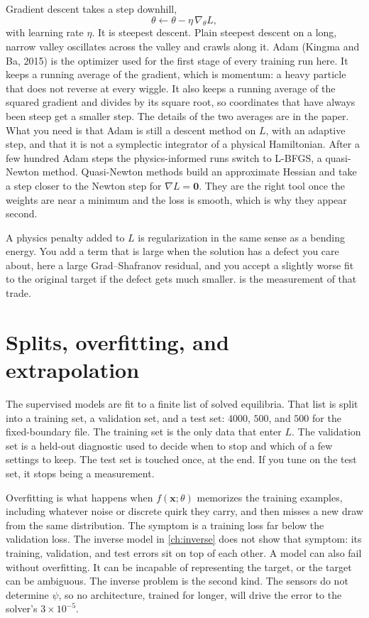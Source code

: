 \documentclass[11pt,a4paper,oneside,openany]{book}
\numberwithin{equation}{chapter}
\newcommand{\grad}{\nabla}
\theoremstyle{definition}
\begin{document}
Gradient descent takes a step downhill,
\begin{equation}
\label{eq:gd}
\theta\leftarrow\theta-\eta\,\grad_{\theta} L,
\end{equation}
with learning rate \(\eta\). It is steepest descent. Plain steepest descent on a long, narrow valley oscillates across the valley and crawls along it. Adam (Kingma and Ba, 2015) is the optimizer used for the first stage of every training run here. It keeps a running average of the gradient, which is momentum: a heavy particle that does not reverse at every wiggle. It also keeps a running average of the squared gradient and divides by its square root, so coordinates that have always been steep get a smaller step. The details of the two averages are in the paper. What you need is that Adam is still a descent method on \(L\), with an adaptive step, and that it is not a symplectic integrator of a physical Hamiltonian. After a few hundred Adam steps the physics-informed runs switch to L-BFGS, a quasi-Newton method. Quasi-Newton methods build an approximate Hessian and take a step closer to the Newton step for \(\grad L=\mathbf{0}\). They are the right tool once the weights are near a minimum and the loss is smooth, which is why they appear second.

A physics penalty added to \(L\) is regularization in the same sense as a bending energy. You add a term that is large when the solution has a defect you care about, here a large Grad--Shafranov residual, and you accept a slightly worse fit to the original target if the defect gets much smaller.  is the measurement of that trade.

\section{Splits, overfitting, and extrapolation}

The supervised models are fit to a finite list of solved equilibria. That list is split into a training set, a validation set, and a test set: \(4000\), \(500\), and \(500\) for the fixed-boundary file. The training set is the only data that enter \(L\). The validation set is a held-out diagnostic used to decide when to stop and which of a few settings to keep. The test set is touched once, at the end. If you tune on the test set, it stops being a measurement.

Overfitting is what happens when \(f(\mathbf{x};\theta)\) memorizes the training examples, including whatever noise or discrete quirk they carry, and then misses a new draw from the same distribution. The symptom is a training loss far below the validation loss. The inverse model in \cref{ch:inverse} does not show that symptom: its training, validation, and test errors sit on top of each other. A model can also fail without overfitting. It can be incapable of representing the target, or the target can be ambiguous. The inverse problem is the second kind. The sensors do not determine \(\psi\), so no architecture, trained for longer, will drive the error to the solver's \(3\times 10^{-5}\).
\end{document}
